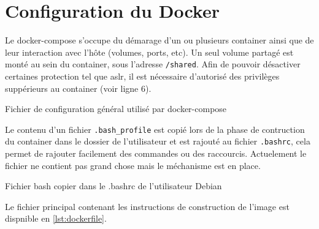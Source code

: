 \chapter{Configuration du Docker}
\label{chap:dockerConf}

Le docker-compose s'occupe du démarage d'un ou plusieurs container ainsi que de leur interaction avec l'hôte (volumes, ports, etc). Un seul volume partagé est monté au sein du container, sous l'adresse \texttt{/shared}. Afin de pouvoir désactiver certaines protection tel que \gls{aslr}, il est nécessaire d'autorisé des privilèges suppérieurs au container (voir ligne 6).

\begin{listing}
	\caption{Fichier de configuration général utilisé par docker-compose}
	\label{lst:dockerCompose}
\end{listing}

Le contenu d'un fichier \texttt{.bash_profile} est copié lors de la phase de contruction du container dans le dossier de l'utilisateur et est rajouté au fichier \texttt{.bashrc}, cela permet de rajouter facilement des commandes ou des raccourcis. Actuelement le fichier ne contient pas grand chose mais le méchanisme est en place.

\begin{listing}
	\caption{Fichier bash copier dans le .bashrc de l'utilisateur Debian}
	\label{lst:bashProfile}
\end{listing}

Le fichier principal contenant les instructions de construction de l'image est dispnible en \autoref{lst:dockerfile}.
